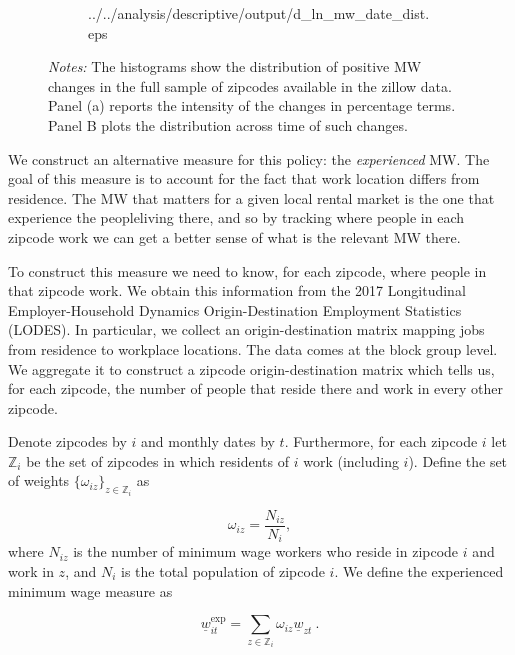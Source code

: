 \begin{figure}[h!]
\begin{subfigure}{.49\textwidth}
			{../../analysis/descriptive/output/d_ln_mw_date_dist.eps}
	\end{subfigure}
	\begin{minipage}{\textwidth} \footnotesize
		\textit{Notes:} The histograms show the distribution of positive MW changes 
		in the full sample of zipcodes available in the zillow data. Panel (a) reports 
		the intensity of the changes in percentage terms. Panel B plots the distribution 
		across time of such changes. 
	\end{minipage}
\end{figure}

We construct an alternative measure for this policy: the \textit{experienced} MW. 
The goal of this measure is to account for the fact that work location differs from 
residence. The MW that matters for a given local rental market is the one that 
experience the peopleliving there, and so by tracking where people in each zipcode 
work we can get a better sense of what is the relevant MW there.

To construct this measure we need to know, for each zipcode, where people in that 
zipcode work. We obtain this information from the 2017 Longitudinal Employer-Household 
Dynamics Origin-Destination Employment Statistics (LODES). In particular, we collect an 
origin-destination matrix mapping jobs from residence to workplace locations. The data 
comes at the block group level. We aggregate it to construct a zipcode origin-destination
matrix which tells us, for each zipcode, the number of people that reside there and work 
in every other zipcode. 

Denote zipcodes by $i$ and monthly dates by $t$. Furthermore, for each zipcode $i$ let 
$\mathds{Z}_i$ be the set of zipcodes in which residents of $i$ work (including $i$). 
Define the set of weights $\{\omega_{iz}\}_{z \in \mathds{Z}_i}$ as 

\begin{equation*} \label{eq:weights}
	\omega_{iz} = \frac{N_{iz}}{N_i} ,
\end{equation*}
where $N_{iz}$ is the number of minimum wage workers who reside in zipcode $i$ and work 
in $z$, and $N_i$ is the total population of zipcode $i$. We define the experienced 
minimum wage measure as

\begin{equation}
	\underline{w}^{\text{exp}}_{it} = \sum_{z \in \mathds{Z}_i} \omega_{iz} \underline{w}_{zt} \ . 
\end{equation}

